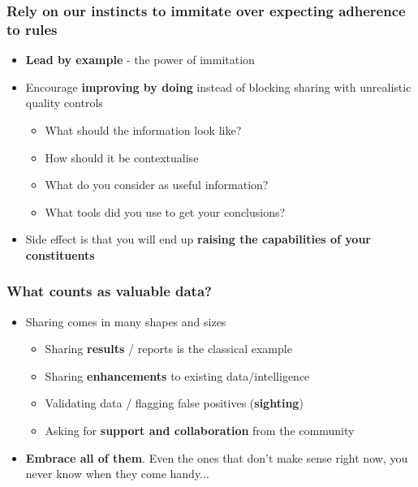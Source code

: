 \begin{frame}
\frametitle{Rely on our instincts to immitate over expecting adherence to rules}
\begin{itemize}
    \item {\bf Lead by example} - the power of immitation
    \item Encourage {\bf improving by doing} instead of blocking sharing with unrealistic quality controls
	\begin{itemize}
		\item What should the information look like?
		\item How should it be contextualise
		\item What do you consider as useful information?
		\item What tools did you use to get your conclusions?
	\end{itemize}
\item Side effect is that you will end up {\bf raising the capabilities of your constituents}
\end{itemize}
\end{frame}

\begin{frame}
\frametitle{What counts as valuable data?}
\begin{itemize}
	\item Sharing comes in many shapes and sizes
	\begin{itemize}
        \item Sharing {\bf results} / reports is the classical example
        \item Sharing {\bf enhancements} to existing data/intelligence
        \item Validating data / flagging false positives ({\bf sighting})
        \item Asking for {\bf support and collaboration} from the community
	\end{itemize}
\item {\bf Embrace all of them}. Even the ones that don't make sense right now, you never know when they come handy...
\end{itemize}
\end{frame}

